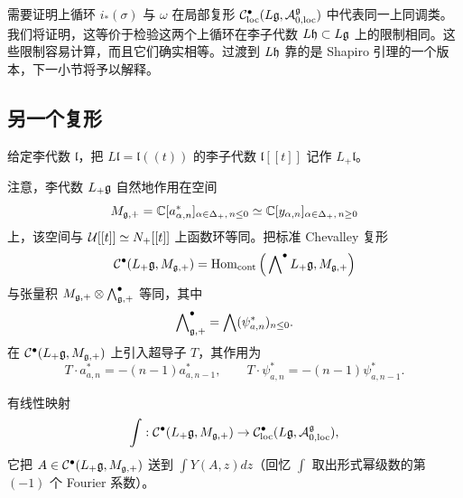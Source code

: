 
需要证明上循环 $i_*(\sigma)$ 与 $\omega$ 在局部复形 $\mathcal{C}^\bullet_{\mathrm{loc}}(L\mathfrak{g},\mathcal{A}^{\mathfrak{g}}_{0,\mathrm{loc}})$ 中代表同一上同调类。我们将证明，这等价于检验这两个上循环在李子代数 $L\mathfrak{h}\subset L\mathfrak{g}$ 上的限制相同。这些限制容易计算，而且它们确实相等。过渡到 $L\mathfrak{h}$ 靠的是 Shapiro 引理的一个版本，下一小节将予以解释。

\subsection{另一个复形}

给定李代数 $\mathfrak{l}$，把 $L\mathfrak{l} = \mathfrak{l}((t))$ 的李子代数 $\mathfrak{l}[[t]]$ 记作 $L_+\mathfrak{l}$。

注意，李代数 $L_+\mathfrak{g}$ 自然地作用在空间
\[
M_{\mathfrak{g},+} = \mathbb{C}[a^*_{\alpha,n}]_{\alpha\in\Delta_+,\,n\le 0}\simeq \mathbb{C}[y_{\alpha,n}]_{\alpha\in\Delta_+,\,n\ge 0}
\]
上，该空间与 $\mathcal{U}[[t]]\simeq N_+[[t]]$ 上函数环等同。把标准 Chevalley 复形
\[
\mathcal{C}^\bullet(L_+\mathfrak{g},M_{\mathfrak{g},+}) = \operatorname{Hom}_{\mathrm{cont}}\Big(\bigwedge\nolimits^\bullet L_+\mathfrak{g},M_{\mathfrak{g},+}\Big)
\]
与张量积 $M_{\mathfrak{g},+}\otimes\bigwedge^\bullet_{\mathfrak{g},+}$ 等同，其中
\[
\bigwedge\nolimits^\bullet_{\mathfrak{g},+} = \bigwedge(\psi^*_{a,n})_{n\le 0}.
\]
在 $\mathcal{C}^\bullet(L_+\mathfrak{g},M_{\mathfrak{g},+})$ 上引入超导子 $T$，其作用为
\[
T\cdot a^*_{a,n} = -(n-1)a^*_{a,n-1},\qquad
T\cdot\psi^*_{a,n} = -(n-1)\psi^*_{a,n-1}.
\]

有线性映射
\[
\int:\mathcal{C}^\bullet(L_+\mathfrak{g},M_{\mathfrak{g},+})\to\mathcal{C}^\bullet_{\mathrm{loc}}(L\mathfrak{g},\mathcal{A}^{\mathfrak{g}}_{0,\mathrm{loc}}),
\]
它把 $A\in\mathcal{C}^\bullet(L_+\mathfrak{g},M_{\mathfrak{g},+})$ 送到 $\int Y(A,z)dz$（回忆 $\int$ 取出形式幂级数的第 $(-1)$ 个 Fourier 系数）。

